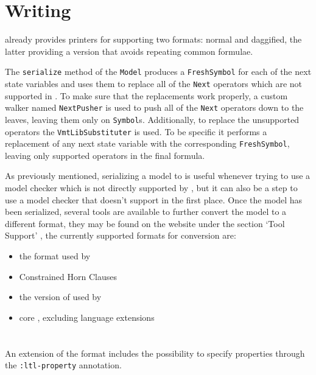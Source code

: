 \section{Writing}
\label{sec:vmtlib-serialization}
\pysmt{} already provides printers for \smtlib{} supporting two formats: normal and daggified, the latter providing a version that avoids repeating common formulae.

The \texttt{serialize} method of the \texttt{Model} produces a \texttt{FreshSymbol} for each of the next state variables and uses them to replace all of the \texttt{Next} operators which are not supported in \vmtlib{}.
To make sure that the replacements work properly, a custom walker named \texttt{NextPusher} is used to push all of the \texttt{Next} operators down to the leaves, leaving them only on \texttt{Symbol}s.
Additionally, to replace the unsupported operators the \texttt{VmtLibSubstituter} is used. To be specific it performs a replacement of any next state variable with the corresponding \texttt{FreshSymbol}, leaving only supported operators in the final formula.

As previously mentioned, serializing a model to \vmtlib{} is useful whenever trying to use a model checker which is not directly supported by \pyvmt{}, but it can also be a step to use a model checker that doesn't support \vmtlib{} in the first place.
Once the model has been serialized, several tools are available to further convert the model to a different format, they may be found on the \vmtlib{} website under the section `Tool Support' \cite{VMT-LIB}, the currently supported formats for conversion are:
\begin{itemize}
    \item \btor{} \cite{DBLP:conf/cav/NiemetzPWB18} the format used by \boolector{}
    \item Constrained Horn Clauses
    \item the version of \smv{} used by \nuxmv{} \cite{DBLP:conf/cav/CavadaCDGMMMRT14}
    \item core \vmtlib{}, excluding language extensions
\end{itemize}


\section{\ltl{}}
An extension of the \vmtlib{} format includes the possibility to specify \ltl{} properties through the \texttt{:ltl-property} annotation.


